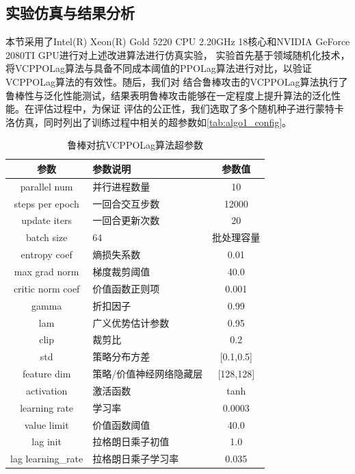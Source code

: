 \subsection{实验仿真与结果分析}
本节采用了Intel(R) Xeon(R) Gold 5220 CPU 2.20GHz 18核心和NVIDIA GeForce 2080TI GPU进行对上述改进算法进行仿真实验，
实验首先基于领域随机化技术，将VCPPOLag算法与具备不同成本阈值的PPOLag算法进行对比，以验证VCPPOLag算法的有效性。随后，我们对
结合鲁棒攻击的VCPPOLag算法执行了鲁棒性与泛化性能测试，结果表明鲁棒攻击能够在一定程度上提升算法的泛化性能。在评估过程中，为保证
评估的公正性，我们选取了多个随机种子进行蒙特卡洛仿真，同时列出了训练过程中相关的超参数如\autoref{tab:algo1_config}。
\begin{table}[htbp]
    \caption{\label{tab:algo1_config}鲁棒对抗VCPPOLag算法超参数}
    \begin{tabularx}{\linewidth}{c|X|c}
        \hline
        参数 & 参数说明 & 参数值 \\ \hline
        parallel num& 并行进程数量 & 10 \\ \hline
        steps per epoch & 一回合交互步数 & 12000 \\ \hline
        update iters & 一回合更新次数 & 20 \\ \hline
        batch size & 64 & 批处理容量\\ \hline
        entropy coef & 熵损失系数 & 0.01 \\ \hline
        max grad norm & 梯度裁剪阈值 & 40.0 \\ \hline
        critic norm coef & 价值函数正则项 & 0.001 \\ \hline
        gamma & 折扣因子 & 0.99 \\ \hline
        lam & 广义优势估计参数 & 0.95 \\ \hline
        clip & 裁剪比 & 0.2 \\ \hline
        std & 策略分布方差 & [0.1,0.5] \\ \hline
        feature dim & 策略/价值神经网络隐藏层 & [128,128] \\ \hline
        activation & 激活函数 & tanh \\ \hline
        learning rate & 学习率 & 0.0003 \\ \hline
        value limit & 价值函数阈值 & 40.0 \\ \hline
        lag init & 拉格朗日乘子初值 & 1.0 \\ \hline
        lag learning_rate & 拉格朗日乘子学习率 & 0.035 \\ \hline
    \end{tabularx}
\end{table}

